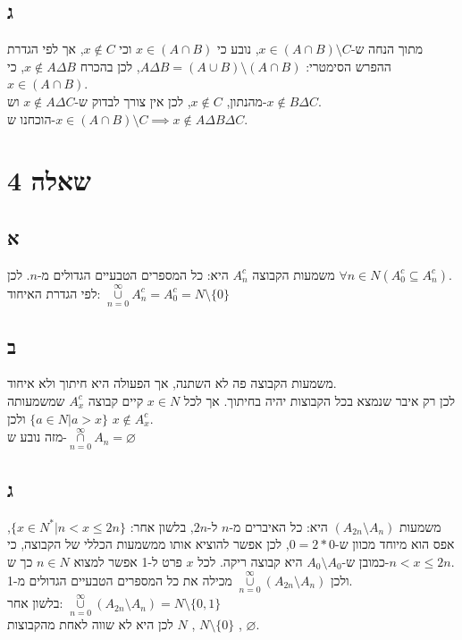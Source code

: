 \documentclass{article}
\begin{document}
\subsection{ג}

מתוך הנחה ש-$x \in (A \cap  B) \setminus C$, נובע כי $x \in (A \cap B) $ וכי $x \not\in C $, אך לפי הגדרת ההפרש הסימטרי: $A \Delta B = (A \cup  B) \setminus  (A \cap  B)$, לכן בהכרח $x \notin A \Delta B$, כי $x \in (A \cap B)$.  \\
מהנתון, $x \not\in C $, לכן אין צורך לבדוק ש-$x \not\in A \Delta C$ וש-$x \not\in B \Delta C$.\\
הוכחנו ש-$x \in (A \cap  B) \setminus C \implies x \not\in A \Delta B \Delta C$.

\section{שאלה 4}
\subsection{א}
משמעות הקבוצה  $A_n^{c}$ היא: כל המספרים הטבעיים הגדולים מ-$n$. לכן $\forall n \in N (A_0^{c} \subseteq A_n^{c})$.\\
לפי הגדרת האיחוד: $\underset{n=0}{\overset{\infty}{\cup }} A_n^{c} = A_0^{c} = N \setminus \{0\}$
  
\subsection{ב}

משמעות הקבוצה פה לא השתנה, אך הפעולה היא חיתוך ולא איחוד.\\
לכן רק איבר שנמצא בכל הקבוצות יהיה בחיתוך. אך לכל $x \in N$ קיים קבוצה  $A_x^{c}$ שמשמעותה $\{a \in N | a > x \}$ ולכן $x \not\in A_x^{c}$.\\
מזה נובע ש-$ \underset{n=0}{\overset{\infty}{\cap }} A_n = \varnothing$


\subsection{ג}
משמעות $(A_{2n} \setminus A_n)$ היא: כל האיברים מ-$n$ ל-$2n$, בלשון אחר: $\{x \in  N^{*} | n < x \le 2n \}$, 
אפס הוא מיוחד מכוון ש-$0 = 2*0$, לכן אפשר להוציא אותו ממשמעות הכללי של הקבוצה,
כי כמובן ש-$A_0 \setminus  A_0$ היא קבוצה ריקה. לכל $x$ פרט ל-1 אפשר למצוא $n \in N$ 
כך ש-$n < x \le 2n$.\\
ולכן $\underset{n=0}{\overset{\infty}{\cup }} (A_{2n} \setminus  A_n)$ מכילה את כל
המספרים הטבעיים הגדולים מ-1.\\
בלשון אחר: $\underset{n=0}{\overset{\infty}{\cup }} (A_{2n} \setminus  A_n) = N \setminus \{0,1\}$\\
לכן היא לא שווה לאחת מהקבוצות $N$ ,  $N \setminus \{0\}$ , $ \varnothing $.
\end{document}

